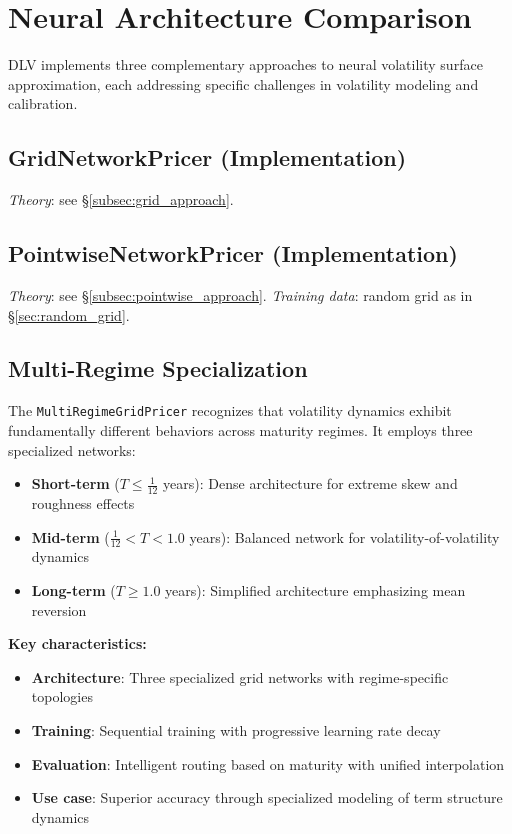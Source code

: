 	\section{Neural Architecture Comparison}
	
	DLV implements three complementary approaches to neural volatility surface approximation, each addressing specific challenges in volatility modeling and calibration.
	
	\subsection{GridNetworkPricer (Implementation)}\label{subsec:grid_impl}
	\noindent\textit{Theory}: see §\ref{subsec:grid_approach}.
	
	\subsection{PointwiseNetworkPricer (Implementation)}\label{subsec:pointwise_impl}
	\noindent\textit{Theory}: see §\ref{subsec:pointwise_approach}.
	\noindent\textit{Training data}: random grid as in §\ref{sec:random_grid}.
	
	\subsection{Multi-Regime Specialization}
	
	The \texttt{MultiRegimeGridPricer} recognizes that volatility dynamics exhibit fundamentally different behaviors across maturity regimes. It employs three specialized networks:
	
	\begin{itemize}[nosep]
		\item \textbf{Short-term} ($T \leq \frac{1}{12}$ years): Dense architecture for extreme skew and roughness effects
		\item \textbf{Mid-term} ($\frac{1}{12} < T < 1.0$ years): Balanced network for volatility-of-volatility dynamics  
		\item \textbf{Long-term} ($T \geq 1.0$ years): Simplified architecture emphasizing mean reversion
	\end{itemize}
	
	\textbf{Key characteristics:}
	\begin{itemize}[nosep]
		\item \textbf{Architecture}: Three specialized grid networks with regime-specific topologies
		\item \textbf{Training}: Sequential training with progressive learning rate decay
		\item \textbf{Evaluation}: Intelligent routing based on maturity with unified interpolation
		\item \textbf{Use case}: Superior accuracy through specialized modeling of term structure dynamics
	\end{itemize}
	
